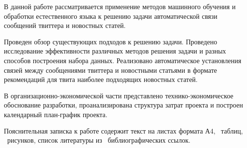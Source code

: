 \summarytitle

В данной работе рассматривается применение методов машинного обучения и обработки естественного языка к решению задачи автоматической связи сообщений твиттера и новостных статей.

Проведен обзор существующих подходов к решению задачи.
Проведено исследование эффективности различных методов решения задачи и разных способов построения набора данных.
Реализовано автоматическое установления связей между сообщениями твиттера и новостными статьями в формате рекомендаций для твита наиболее подходящих новостных статей.

В организационно-экономической части представлено технико-экономическое обоснование разработки, проанализирована структура затрат проекта и построен календарный план-график проекта.

Пояснительная записка к работе содержит текст на \pageref{LastPage} листах формата А4,  \totfig~таблиц, \tottab~рисунков, список литературы из \totbibref~библиографических ссылок.
\thispagestyle{empty}
